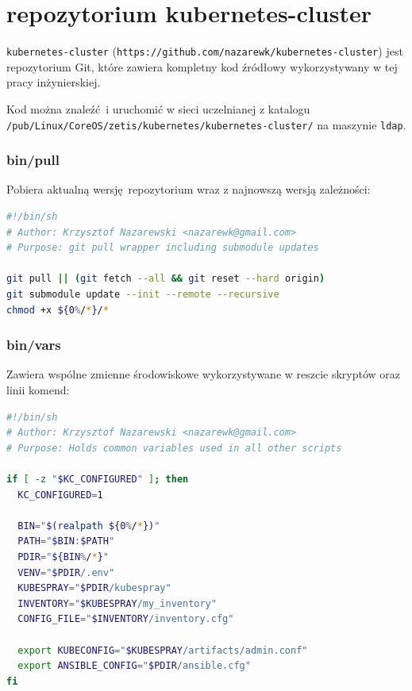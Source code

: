 \documentclass[a4paper,12pt,twoside,openany]{report}
\newcommand{\passthrough}[1]{#1}
\begin{document}
\hypertarget{repozytorium-kubernetes-cluster}{%
\section{repozytorium
kubernetes-cluster}\label{repozytorium-kubernetes-cluster}}

\passthrough{\lstinline!kubernetes-cluster!}
(\passthrough{\lstinline!https://github.com/nazarewk/kubernetes-cluster!})
jest repozytorium Git, które zawiera kompletny kod źródłowy
wykorzystywany w tej pracy inżynierskiej.

Kod można znaleźć~i uruchomić w sieci uczelnianej z katalogu
\passthrough{\lstinline!/pub/Linux/CoreOS/zetis/kubernetes/kubernetes-cluster/!}
na maszynie \passthrough{\lstinline!ldap!}.

\hypertarget{binpull}{%
\subsubsection{bin/pull}\label{binpull}}

Pobiera aktualną wersję~repozytorium wraz z najnowszą wersją zależności:

\begin{lstlisting}[language=bash]
#!/bin/sh
# Author: Krzysztof Nazarewski <nazarewk@gmail.com>
# Purpose: git pull wrapper including submodule updates

git pull || (git fetch --all && git reset --hard origin)
git submodule update --init --remote --recursive
chmod +x ${0%/*}/*
\end{lstlisting}

\hypertarget{binvars}{%
\subsubsection{bin/vars}\label{binvars}}

Zawiera wspólne zmienne środowiskowe wykorzystywane w reszcie skryptów
oraz linii komend:

\begin{lstlisting}[language=bash]
#!/bin/sh
# Author: Krzysztof Nazarewski <nazarewk@gmail.com>
# Purpose: Holds common variables used in all other scripts

if [ -z "$KC_CONFIGURED" ]; then
  KC_CONFIGURED=1

  BIN="$(realpath ${0%/*})"
  PATH="$BIN:$PATH"
  PDIR="${BIN%/*}"
  VENV="$PDIR/.env"
  KUBESPRAY="$PDIR/kubespray"
  INVENTORY="$KUBESPRAY/my_inventory"
  CONFIG_FILE="$INVENTORY/inventory.cfg"

  export KUBECONFIG="$KUBESPRAY/artifacts/admin.conf"
  export ANSIBLE_CONFIG="$PDIR/ansible.cfg"
fi
\end{lstlisting}
\end{document}

